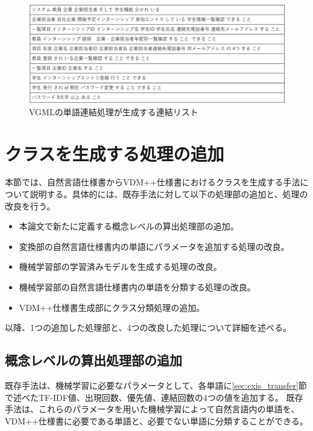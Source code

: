 \begin{figure}[t]
    \begin{center}
        \includegraphics[width=1.0\columnwidth]{image/vgml_connect_list.png}
        \caption{VGMLの単語連結処理が生成する連結リスト}
        \label{fig:vgml_connect_list}
    \end{center}
\end{figure}

\section{クラスを生成する処理の追加}
\label{sec:generate_class}
本節では、自然言語仕様書からVDM++仕様書におけるクラスを生成する手法について説明する。具体的には、既存手法に対して以下の処理部の追加と、処理の改良を行う。

\begin{itemize}
    \item 本論文で新たに定義する概念レベルの算出処理部の追加。
    \item 変換部の自然言語仕様書内の単語にパラメータを追加する処理の改良。
    \item 機械学習部の学習済みモデルを生成する処理の改良。
    \item 機械学習部の自然言語仕様書内の単語を分類する処理の改良。
    \item VDM++仕様書生成部にクラス分類処理の追加。
\end{itemize}

以降、1つの追加した処理部と、4つの改良した処理について詳細を述べる。

\subsection{概念レベルの算出処理部の追加}
\label{sec:part_calc_concept_level}
既存手法は、機械学習に必要なパラメータとして、各単語に\ref{sec:exis_transfer}節で述べたTF-IDF値、出現回数、優先値、連結回数の4つの値を追加する。
既存手法は、これらのパラメータを用いた機械学習によって自然言語内の単語を、VDM++仕様書に必要である単語と、必要でない単語に分類することができる。

